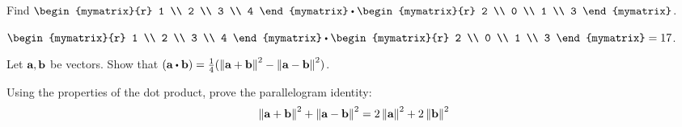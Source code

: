 \begin{ex}
  Find $\begin{mymatrix}{r}
    1 \\
    2 \\
    3 \\
    4
  \end{mymatrix} \dotprod \begin{mymatrix}{r}
    2 \\
    0 \\
    1 \\
    3
  \end{mymatrix}$.
  \begin{sol}
    $\begin{mymatrix}{r}
      1 \\
      2 \\
      3 \\
      4
    \end{mymatrix} \dotprod \begin{mymatrix}{r}
      2 \\
      0 \\
      1 \\
      3
    \end{mymatrix} = 17$.
  \end{sol}
\end{ex}

\begin{ex}
  Let $\vect{a},\vect{b}$ be vectors. Show that
  $(\vect{a}\dotprod \vect{b}) =\frac{1}{4}(\norm{ \vect{a}+\vect{b}}
  ^{2}-\norm{\vect{a}-\vect{b}} ^{2})$.
\end{ex}

\begin{ex}
  Using the properties of the dot product, prove the parallelogram
  identity:
  \begin{equation*}
    \norm{\vect{a}+\vect{b}} ^{2}+\norm{\vect{a}-\vect{b}}
    ^{2}=2\norm{\vect{a}} ^{2}+2\norm{\vect{b}
    } ^{2}
  \end{equation*}
\end{ex}
